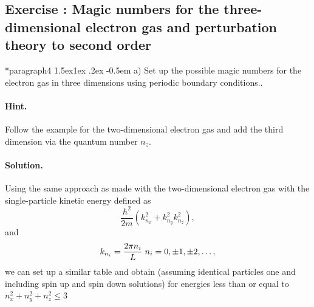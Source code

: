 \documentclass[%
oneside,                 %
final,                   %
10pt]{article}
\makeatletter
\newenvironment{doconceexercise}{}{}
\newcounter{doconceexercisecounter}
\newcommand\subex{\@startsection*{paragraph}{4}{\z@}%
                  {1.5ex\@plus1ex \@minus.2ex}%
                  {-0.5em}%
                  {\normalfont\normalsize\bfseries}}
\makeatother
\begin{document}
\begin{doconceexercise}

\subsection*{Exercise \thedoconceexercisecounter: Magic numbers for the three-dimensional electron gas and perturbation theory to second order}



\subex{a)}
Set up the possible magic numbers for the electron gas in three dimensions using periodic boundary conditions..


\paragraph{Hint.}
Follow the example for the two-dimensional electron gas and add the third dimension via the quantum number $n_z$.



\paragraph{Solution.}
Using the same approach as made with the two-dimensional electron gas with the single-particle kinetic energy defined as
\[
\frac{\hbar^2}{2m}\left(k_{n_x}^2+k_{n_y}^2k_{n_z}^2\right),
\]
and 
\[
k_{n_i}=\frac{2\pi n_i}{L} \hspace{0.1cm} n_i = 0, \pm 1, \pm 2, \dots, 
\]
we can set up a similar table and obtain (assuming identical particles one and including spin up and spin down solutions)  for energies less than or equal to $n_{x}^{2}+n_{y}^{2}+n_{z}^{2}\le 3$



\end{doconceexercise}
\end{document}
